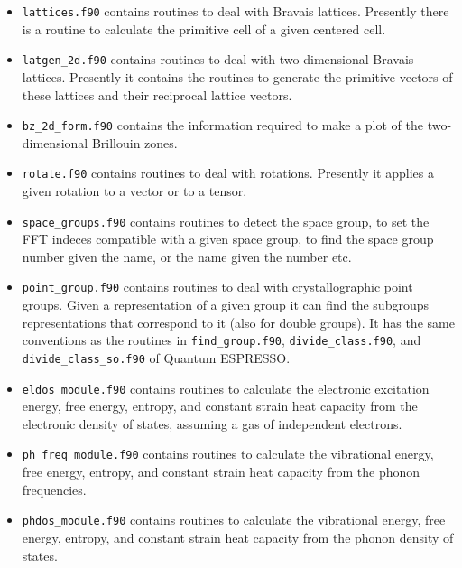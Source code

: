 \documentclass[12pt,a4paper]{article}
\def\qe{{\sc Quantum ESPRESSO}}
\begin{document}
\begin{itemize}

\item \texttt{lattices.f90} contains routines to deal with Bravais lattices.
Presently there is a routine to calculate the primitive cell of
a given centered cell.

\item
\texttt{latgen\_2d.f90} contains routines to deal with two dimensional
Bravais lattices. Presently it contains the routines to generate the
primitive vectors of these lattices and their reciprocal lattice vectors.

\item
\texttt{bz\_2d\_form.f90} contains the information required to make a
plot of the two-dimensional Brillouin zones.

\item
\texttt{rotate.f90} contains routines to deal with rotations. Presently it
applies a given rotation to a vector or to a tensor.

\item
\texttt{space\_groups.f90} contains routines to detect the space group,
to set the FFT indeces compatible with a given space group, to find the
space group number given the name, or the name given the number etc.

\item
\texttt{point\_group.f90} contains routines to deal with crystallographic
point groups. Given a representation of a given group it can find 
the subgroups representations that correspond to it (also for
double groups). It has the same conventions as the routines 
in \texttt{find\_group.f90}, \texttt{divide\_class.f90}, and 
\texttt{divide\_class\_so.f90} of \qe.

\item
\texttt{eldos\_module.f90} contains routines to calculate the electronic
excitation energy, free energy, entropy, and constant strain heat capacity
from the electronic density of states, assuming a gas of independent 
electrons.   

\item
\texttt{ph\_freq\_module.f90} contains routines to calculate the vibrational
energy, free energy, entropy, and constant strain heat capacity from the
phonon frequencies.   

\item
\texttt{phdos\_module.f90} contains routines to calculate the vibrational
energy, free energy, entropy, and constant strain heat capacity from the
phonon density of states.


\end{itemize}
\end{document}
